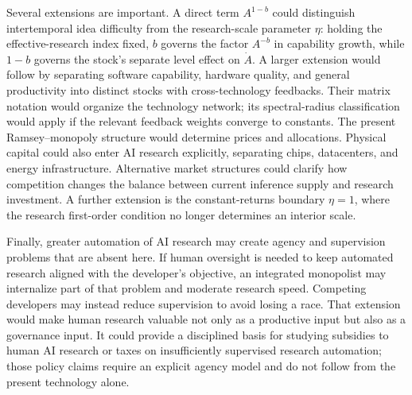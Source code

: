 Several extensions are important. A direct term \(A^{1-b}\) could distinguish
intertemporal idea difficulty from the research-scale parameter \(\eta\): holding
the effective-research index fixed, \(b\) governs the factor \(A^{-b}\) in
capability growth, while \(1-b\) governs the stock's separate level effect on
\(\dot A\). A larger extension would follow
\citet{davidsonetal2026} by separating software capability, hardware quality, and
general productivity into distinct stocks with cross-technology feedbacks. Their
matrix notation would organize the technology network; its spectral-radius
classification would apply if the relevant feedback weights converge to constants.
The present Ramsey--monopoly structure would determine prices and allocations.
Physical capital could also enter AI research explicitly, separating
chips, datacenters, and energy infrastructure. Alternative market structures
could clarify how competition changes the balance between current inference
supply and research investment. A further extension is the constant-returns
boundary \(\eta=1\), where the research first-order condition no longer determines
an interior scale.

Finally, greater automation of AI research may create agency and supervision
problems that are absent here. If human oversight is needed to keep automated
research aligned with the developer's objective, an integrated monopolist may
internalize part of that problem and moderate research speed. Competing developers
may instead reduce supervision to avoid losing a race. That extension would make
human research valuable not only as a productive input but also as a governance
input. It could provide a disciplined basis for studying subsidies to human AI
research or taxes on insufficiently supervised research automation; those policy
claims require an explicit agency model and do not follow from the present
technology alone.
